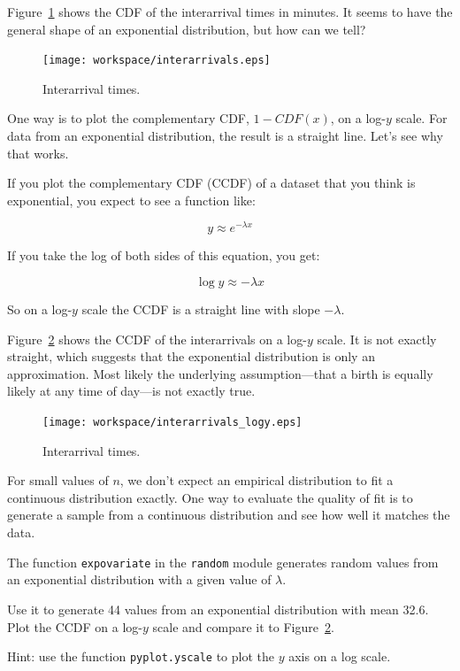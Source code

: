 \documentclass[12pt]{book}
\begin{document}
Figure~\ref{interarrivals} shows the CDF of the interarrival times
in minutes.  It seems to have the general shape of an exponential
distribution, but how can we tell?

\begin{figure}
\centerline{\texttt{[image: workspace/interarrivals.eps]}}
\caption{Interarrival times.}
\label{interarrivals}
\end{figure}

One way is to plot the complementary CDF, $1 - CDF(x)$, on a
log-$y$ scale.  For data from an exponential distribution, the result
is a straight line.  Let's see why that works.

If you plot the complementary CDF (CCDF) of a dataset that you think is
exponential, you expect to see a function like:

\[ y \approx e^{-\lambda x} \]

If you take the log of both sides of this equation, you get:

\[ \log y \approx -\lambda x \]

So on a log-$y$ scale the CCDF is a straight line
with slope $-\lambda$.

Figure~\ref{interarrivals_logy} shows the CCDF of the interarrivals on
a log-$y$ scale.  It is not exactly straight, which suggests that the
exponential distribution is only an approximation.  Most likely the
underlying assumption---that a birth is equally likely at any time of
day---is not exactly true.

\begin{figure}
\centerline{\texttt{[image: workspace/interarrivals\_logy.eps]}}
\caption{Interarrival times.}
\label{interarrivals_logy}
\end{figure}

\begin{ex}

For small values of $n$, we don't expect an empirical distribution
to fit a continuous distribution exactly.  One way to evaluate
the quality of fit is to generate a sample from a continuous
distribution and see how well it matches the data.

The function {\tt expovariate} in the {\tt random} module
generates random values from an exponential distribution with
a given value of $\lambda$.

Use it to generate 44 values from an exponential distribution with
mean 32.6.  Plot the CCDF on a log-$y$ scale and compare
it to Figure~\ref{interarrivals_logy}.

Hint: use the function {\tt pyplot.yscale} to plot the $y$ axis
on a log scale.

\end{ex}
\end{document}
